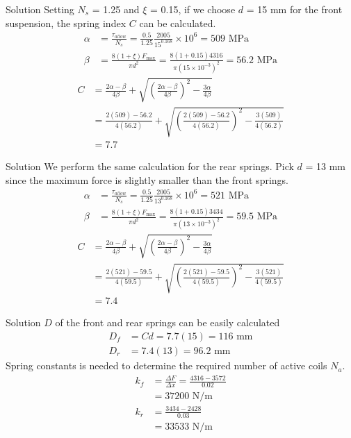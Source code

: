 \documentclass[10pt, svgnames]{beamer}
\begin{document}
\begin{frame}[label={sec:org69892b3}]{Solution}
Setting \(N_s\) = 1.25 and \(\xi\) = 0.15, if we choose \(d\) = 15 mm for the front suspension, the spring index \(C\) can be calculated.
\begin{align*}
  \alpha  &= \frac{\tau_{allow}}{N_s} = \frac{0.5}{1.25}\frac{2005}{15^{0.168}} \times {10^6} = 509 \text{ MPa} \\ 
  \beta  &= \frac{8(1 + \xi )F_{\max}}{\pi d^2} = \frac{8(1 + 0.15)4316}{\pi {(15 \times 10^{ - 3})}^2} = 56.2 \text{ MPa}
\end{align*}
\begin{align*}
  C &= \frac{2\alpha  - \beta}{4\beta} + \sqrt {\left( \frac{2\alpha  - \beta}{4\beta} \right)^2 - \frac{3\alpha}{4\beta}}  \\ 
    & = \frac{2(509) - 56.2}{4(56.2)} + \sqrt {\left( \frac{2(509) - 56.2}{4(56.2)} \right)^2 - \frac{3(509)}{4(56.2)}}  \\ 
    &= 7.7 
\end{align*}
\end{frame}

\begin{frame}[label={sec:orga07777f}]{Solution}
We perform the same calculation for the rear springs. Pick \(d\) = 13 mm since the maximum force is slightly smaller than the front springs.
 \begin{align*}
   \alpha  &= \frac{{{\tau_{allow}}}}{{{N_s}}} = \frac{{0.5}}{{1.25}}\frac{{2005}}{{{{13}^{0.168}}}} \times {10^6} = 521 \text{ MPa} \\ 
  \beta  &= \frac{{8(1 + \xi ){F_{\max }}}}{{\pi {d^2}}} = \frac{{8(1 + 0.15)3434}}{{\pi {(13 \times 10^{ - 3})}^2}} = 59.5 \text{ MPa}
\end{align*}
\begin{align*}
  C &= \frac{{2\alpha  - \beta }}{{4\beta }} + \sqrt {{{\left( {\frac{{2\alpha  - \beta }}{{4\beta }}} \right)}^2} - \frac{{3\alpha }}{{4\beta }}}  \\ 
    & = \frac{{2(521) - 59.5}}{4(59.5)} + \sqrt {{{\left( {\frac{{2(521) - 59.5}}{{4(59.5)}}} \right)}^2} - \frac{{3(521)}}{{4(59.5)}}}  \\ 
    &= 7.4 
\end{align*}
\end{frame}

\begin{frame}[label={sec:org2f13c7a}]{Solution}
\(D\) of the front and rear springs can be easily calculated
\begin{align*}
  D_f &= Cd = 7.7(15) = 116 \text{ mm} \\
  D_r &= 7.4(13) = 96.2 \text{ mm}
\end{align*}
Spring constants is needed to determine the required number of active coils \(N_a\).
\begin{align*}
  k_f &= \frac{\Delta F}{\Delta x} = \frac{4316 - 3572}{0.02} \\
      &= 37200 \text{ N/m} \\
  k_r &= \frac{3434 - 2428}{0.03} \\
      &= 33533 \text{ N/m}
\end{align*}
\end{frame}
\end{document}

